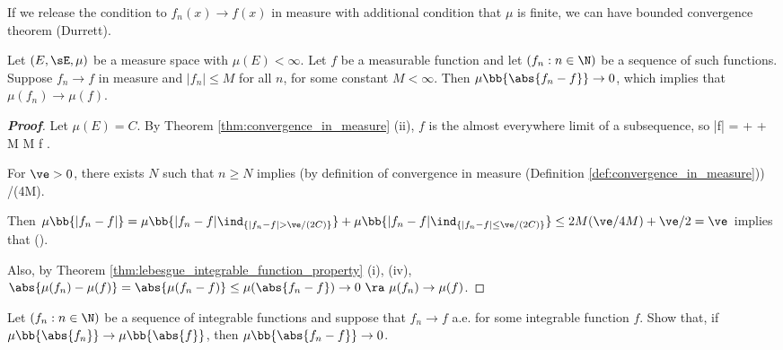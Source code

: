 If we release the condition to $f_n(x) \to f(x)$ in measure with additional condition that $\mu$ is finite, we can have bounded convergence theorem (Durrett\cite{Durrett_2004}).

\begin{theorem}\label{thm:bounded_convergence_finite_measure}
Let $(E,\sE,\mu)$ be a measure space with $\mu(E) <\infty$. Let $f$ be a measurable function and let $(f_n : n \in \N)$ be a sequence of such functions. Suppose $f_n \to f$ in measure and $|f_n| \leq M$ for all $n$, for some constant $M < \infty$. Then $\mu\bb{\abs{f_n - f}}\to 0$, which implies that $\mu(f_n)\to \mu(f)$.
\end{theorem}

\begin{proof}[\bf Proof]
Let $\mu(E) = C$. By Theorem \ref{thm:convergence_in_measure} (ii), $f$ is the almost everywhere limit of a subsequence, so
\be
|f| =  \leq {} +  \leq {} + M \to M \quad\ra\quad f .
\ee

For $\ve > 0$, there exists $N$ such that $n \geq N$ implies (by definition of convergence in measure (Definition \ref{def:convergence_in_measure}))
\be
\mu{} \leq \ve/(4M).
\ee

Then $\mu\bb{|f_n-f|} = \mu\bb{|f_n-f|\ind_{\{|f_n-f|>\ve/(2C)\}}}+\mu\bb{|f_n-f|\ind_{\{|f_n-f|\leq \ve/(2C)\}}}  \leq 2M(\ve/4M)+\ve/2 = \ve$ implies that
\be
\mu().
\ee

Also, by Theorem \ref{thm:lebesgue_integrable_function_property} (i), (iv), $\abs{\mu(f_n) - \mu(f)} = \abs{\mu(f_n - f)} \leq \mu(\abs{f_n-f})\to 0\ \ra\  \mu(f_n)\to \mu(f)$.
\end{proof}

\begin{theorem}
Let $(f_n:n\in\N)$ be a sequence of integrable functions and suppose that $f_n\to f$ a.e. for some integrable function $f$. Show that, if $\mu\bb{\abs{f_n}} \to \mu\bb{\abs{f}}$, then $\mu\bb{\abs{f_n - f}} \to 0$.
\end{theorem}

